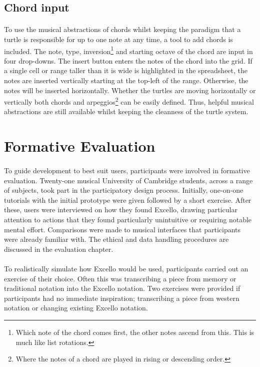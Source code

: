 \subsection{Chord input}

\paragraph{} To use the musical abstractions of chords whilst keeping the paradigm that a turtle is responsible for up to one note at any time, a tool to add chords is included. The note, type, inversion\footnote{Which note of the chord comes first, the other notes ascend from this. This is much like list rotations.} and starting octave of the chord are input in four drop-downs. The insert button enters the notes of the chord into the grid. If a single cell or range taller than it is wide is highlighted in the spreadsheet, the notes are inserted vertically starting at the top-left of the range. Otherwise, the notes will be inserted horizontally. Whether the turtles are moving horizontally or vertically both chords and arpeggios\footnote{Where the notes of a chord are played in rising or descending order.} can be easily defined. Thus, helpful musical abstractions are still available whilst keeping the cleanness of the turtle system.

\section{Formative Evaluation}

\paragraph{} To guide development to best suit users, participants were involved in formative evaluation. Twenty-one musical University of Cambridge students, across a range of subjects, took part in the participatory design process. Initially, one-on-one tutorials with the initial prototype were given followed by a short exercise. After these, users were interviewed on how they found Excello, drawing particular attention to actions that they found particularly unintuitive or requiring notable mental effort. Comparisons were made to musical interfaces that participants were already familiar with. The ethical and data handling procedures are discussed in the evaluation chapter.

\paragraph{} To realistically simulate how Excello would be used, participants carried out an exercise of their choice. Often this was transcribing a piece from memory or traditional notation into the Excello notation. Two exercises were provided if participants had no immediate inspiration; transcribing a piece from western notation or changing existing Excello notation.

